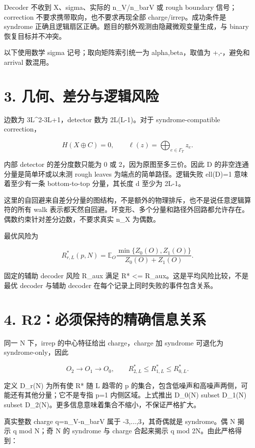 \documentclass[11pt,a4paper]{article}
\begin{document}
Decoder 不收到 X、sigma、实际的 n\_V/n\_barV 或 rough boundary 信号；correction 不要求携带取向，也不要求再现全部 charge/irrep。成功条件是 syndrome 正确且逻辑扇区正确。题目的额外观测由隐藏微观变量生成，与 binary 恢复目标并不冲突。

以下使用数学 sigma 记号；取向矩阵索引统一为 alpha,beta，取值为 +,-，避免和 arrival 数混用。

\section*{3. 几何、差分与逻辑风险}

边数为 3L\textasciicircum{}2-3L+1，detector 数为 2L(L-1)。对于 syndrome-compatible correction，

\[
H(X\oplus C)=0,\qquad
\ell(z)=\bigoplus_{e\in\Gamma_T}z_e.
\]

内部 detector 的差分度数只能为 0 或 2，因为原图至多三价。因此 D 的非空连通分量是简单环或以未测 rough leaves 为端点的简单路径。逻辑失败 ell(D)=1 意味着至少有一条 bottom-to-top 分量，其长度 d 至少为 2L-1。

这里的自回避来自差分分量的图结构，不是额外的物理排斥，也不是说任意逻辑算符的所有 walk 表示都天然自回避。环变形、多个分量和路径外回路都允许存在。偶数约束针对差分边数，不要求真实 n\_X 为偶数。

最优风险为

\[
R^*_{r,L}(p,N)=\mathbb E_O\frac{\min\{Z_0(O),Z_1(O)\}}{Z_0(O)+Z_1(O)}.
\]

固定的辅助 decoder 风险 R\_aux 满足 R* <= R\_aux。这是平均风险比较，不是最优 decoder 与辅助 decoder 在每个记录上同时失败的事件包含关系。

\section*{4. R2：必须保持的精确信息关系}

同一 N 下，irrep 的中心特征给出 charge，charge 加 syndrome 可退化为 syndrome-only，因此

\[
O_2\longrightarrow O_1\longrightarrow O_0,
\qquad R^*_{2,L}\le R^*_{1,L}\le R^*_{0,L}.
\]

定义 D\_r(N) 为所有使 R* 随 L 趋零的 p 的集合，包含低噪声和高噪声两侧，可能还有其他分量；它不是专指 p=1 内侧区域。上式推出 D\_0(N) subset D\_1(N) subset D\_2(N)。更多信息意味着集合不缩小，不保证严格扩大。

真实整数 charge q=n\_V-n\_barV 属于 -3,...,3，其奇偶就是 syndrome。偶 N 揭示 q mod N；奇 N 的 syndrome 与 charge 合起来揭示 q mod 2N。由此严格得到：
\end{document}

